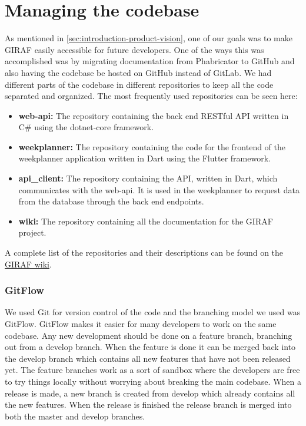 \section{Managing the codebase}
As mentioned in \autoref{sec:introduction-product-vision}, one of our goals was to make GIRAF easily accessible for future developers.
One of the ways this was accomplished was by migrating documentation from Phabricator to GitHub and also having the codebase be hosted on GitHub instead of GitLab.
We had different parts of the codebase in different repositories to keep all the code separated and organized.
The most frequently used repositories can be seen here:

\begin{itemize}
    \item \textbf{web-api:} The repository containing the back end RESTful API written in C\# using the dotnet-core framework.
    \item \textbf{weekplanner:} The repository containing the code for the frontend of the weekplanner application written in Dart using the Flutter framework. 
    \item \textbf{api\_client:} The repository containing the API, written in Dart, which communicates with the web-api. It is used in the weekplanner to request data from the database through the back end endpoints.
    \item \textbf{wiki:} The repository containing all the documentation for the GIRAF project. 
\end{itemize}
A complete list of the repositories and their descriptions can be found on the \href{https://github.com/aau-giraf/wiki/blob/master/Repositories/repository_discription.md}{GIRAF wiki}.

\subsubsection{GitFlow}
We used Git for version control of the code and the branching model we used was GitFlow. 
GitFlow makes it easier for many developers to work on the same codebase. 
Any new development should be done on a feature branch, branching out from a develop branch. 
When the feature is done it can be merged back into the develop branch which contains all new features that have not been released yet. 
The feature branches work as a sort of sandbox where the developers are free to try things locally without worrying about breaking the main codebase. 
When a release is made, a new branch is created from develop which already contains all the new features. 
When the release is finished the release branch is merged into both the master and develop branches.
